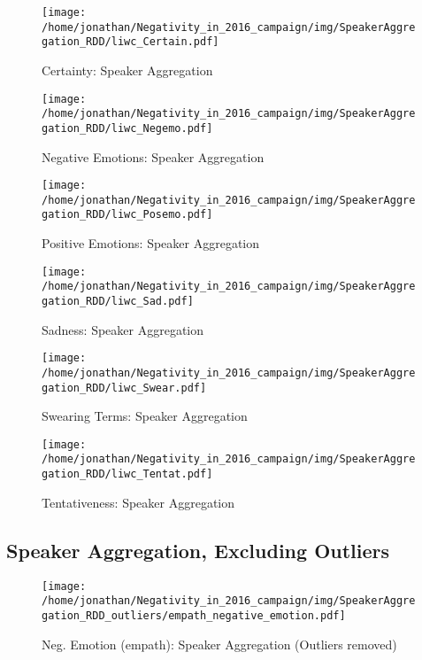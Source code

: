 \begin{figure}[h]\centering
	\texttt{[image: /home/jonathan/Negativity\_in\_2016\_campaign/img/SpeakerAggregation\_RDD/liwc\_Certain.pdf]}
	\caption{Certainty: Speaker Aggregation}
	\label{fig: sa_Certainty}
\end{figure}

\begin{figure}[h]\centering
	\texttt{[image: /home/jonathan/Negativity\_in\_2016\_campaign/img/SpeakerAggregation\_RDD/liwc\_Negemo.pdf]}
	\caption{Negative Emotions: Speaker Aggregation}
	\label{fig: sa_Negative Emotions}
\end{figure}

\begin{figure}[h]\centering
	\texttt{[image: /home/jonathan/Negativity\_in\_2016\_campaign/img/SpeakerAggregation\_RDD/liwc\_Posemo.pdf]}
	\caption{Positive Emotions: Speaker Aggregation}
	\label{fig: sa_Positive Emotions}
\end{figure}

\begin{figure}[h]\centering
	\texttt{[image: /home/jonathan/Negativity\_in\_2016\_campaign/img/SpeakerAggregation\_RDD/liwc\_Sad.pdf]}
	\caption{Sadness: Speaker Aggregation}
	\label{fig: sa_Sadness}
\end{figure}

\begin{figure}[h]\centering
	\texttt{[image: /home/jonathan/Negativity\_in\_2016\_campaign/img/SpeakerAggregation\_RDD/liwc\_Swear.pdf]}
	\caption{Swearing Terms: Speaker Aggregation}
	\label{fig: sa_Swearing Terms}
\end{figure}

\begin{figure}[h]\centering
	\texttt{[image: /home/jonathan/Negativity\_in\_2016\_campaign/img/SpeakerAggregation\_RDD/liwc\_Tentat.pdf]}
	\caption{Tentativeness: Speaker Aggregation}
	\label{fig: sa_Tentativeness}
\end{figure}

\clearpage
\pagebreak

\subsection{Speaker Aggregation, Excluding Outliers}

\begin{figure}[h]\centering
	\texttt{[image: /home/jonathan/Negativity\_in\_2016\_campaign/img/SpeakerAggregation\_RDD\_outliers/empath\_negative\_emotion.pdf]}
	\caption{Neg. Emotion (empath): Speaker Aggregation (Outliers removed)}
	\label{fig: sa_Neg. Emotion (empath)}
\end{figure}

